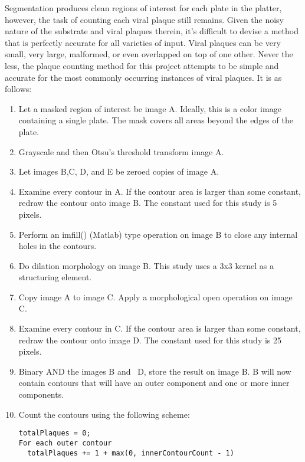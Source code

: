 \documentclass[12pt,final,onecolumn]{IEEEtran}
\begin{document}
Segmentation produces clean regions of interest for each plate in the platter, however, the task of counting each viral plaque still remains. Given the noisy nature of the substrate and viral plaques therein, it's difficult to devise a method that is perfectly accurate for all varieties of input. Viral plaques can be very small, very large, malformed, or even overlapped on top of one other.  Never the less, the plaque counting method for this project attempts to be simple and accurate for the most commonly occurring instances of viral plaques. It is as follows:

\begin{enumerate}
 \item Let a masked region of interest be image A. Ideally, this is a color image containing a single plate. The mask covers all areas beyond the edges of the plate.

\item  Grayscale and then Otsu's threshold transform image A.

\item  Let images B,C, D, and E be zeroed copies of image A.

\item  Examine every contour in A. If the contour area is larger than some constant,  redraw the contour onto image B. The constant used for this study is 5 pixels.

\item  Perform an imfill()  (Matlab) type operation on image B to close any internal holes in the contours.

\item  Do dilation morphology on image B. This study uses a 3x3 kernel as a structuring element.

\item  Copy image A to image C. Apply a morphological open operation on image C.

\item  Examine every contour in C. If the contour area is larger than some constant, redraw the contour onto image D. The constant used for this study is 25 pixels.

\item  Binary AND the images B and ~D, store the result on image B. B will now contain contours that will have an outer component and one or more inner components.

\item  Count the contours using the following scheme: 
\begin{verbatim}
totalPlaques = 0;
For each outer contour
  totalPlaques += 1 + max(0, innerContourCount - 1)
\end{verbatim}
\end{enumerate}
\end{document}
